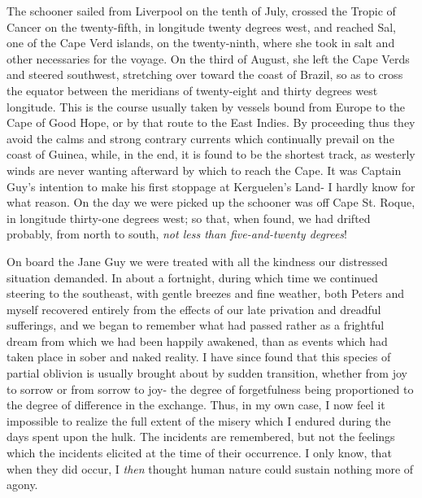 The schooner sailed from Liverpool on the tenth of July, crossed the Tropic
of Cancer on the twenty-fifth, in longitude twenty degrees west, and reached
Sal, one of the Cape Verd islands, on the twenty-ninth, where she took in salt
and other necessaries for the voyage. On the third of August, she left the Cape
Verds and steered southwest, stretching over toward the coast of Brazil, so as
to cross the equator between the meridians of twenty-eight and thirty degrees
west longitude. This is the course usually taken by vessels bound from Europe to
the Cape of Good Hope, or by that route to the East Indies. By proceeding thus
they avoid the calms and strong contrary currents which continually prevail on
the coast of Guinea, while, in the end, it is found to be the shortest track, as
westerly winds are never wanting afterward by which to reach the Cape. It was
Captain Guy's intention to make his first stoppage at Kerguelen's Land- I hardly
know for what reason. On the day we were picked up the schooner was off Cape St.
Roque, in longitude thirty-one degrees west; so that, when found, we had drifted
probably, from north to south, \emph{not less than five-and-twenty degrees}! 

On board the Jane Guy we were treated with all the kindness our distressed
situation demanded. In about a fortnight, during which time we continued
steering to the southeast, with gentle breezes and fine weather, both Peters and
myself recovered entirely from the effects of our late privation and dreadful
sufferings, and we began to remember what had passed rather as a frightful dream
from which we had been happily awakened, than as events which had taken place in
sober and naked reality. I have since found that this species of partial
oblivion is usually brought about by sudden transition, whether from joy to
sorrow or from sorrow to joy- the degree of forgetfulness being proportioned to
the degree of difference in the exchange. Thus, in my own case, I now feel it
impossible to realize the full extent of the misery which I endured during the
days spent upon the hulk. The incidents are remembered, but not the feelings
which the incidents elicited at the time of their occurrence. I only know, that
when they did occur, I \emph{then} thought human nature could sustain nothing
more of agony. 

